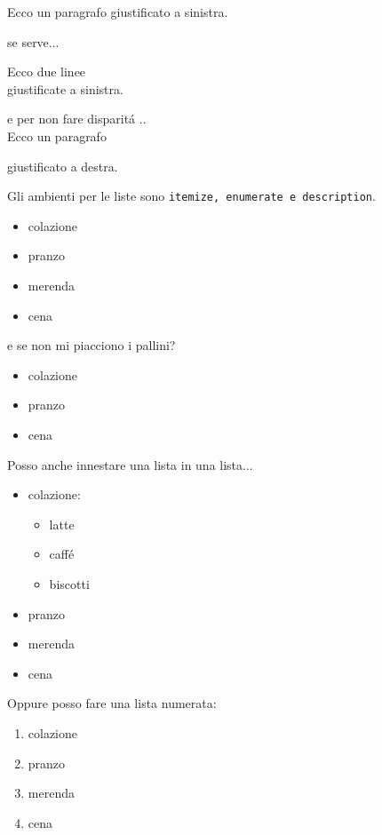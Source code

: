 \documentclass[12pt]{article}
\begin{document}
\bigskip

\begin{flushleft}
Ecco un paragrafo giustificato a sinistra. 

se serve...

Ecco due linee \\
giustificate a sinistra.
\end{flushleft}

\bigskip
\begin{flushright}
e per non fare disparit\'a ..\\
Ecco un paragrafo 

giustificato a destra. 

\end{flushright}
\newpage

Gli ambienti per le {\LARGE liste} sono {\tt itemize, enumerate e description}.

\begin{itemize}
\item colazione
\item pranzo
\item merenda
\item cena
\end{itemize}

e se non mi piacciono i pallini?
\begin{itemize}
\item[!] colazione
\item[?] pranzo
\item[+] cena
\end{itemize}


Posso anche innestare una lista in una lista...
\begin{itemize}
\item colazione:
	\begin{itemize}
		\item latte
		\item caff\'e
		\item biscotti
	\end{itemize}
\item pranzo
\item merenda
\item cena
\end{itemize}
 
Oppure posso fare una lista numerata: 

\begin{enumerate}
\item colazione
\item pranzo
\item merenda
\item cena
\end{enumerate}
 
\end{document}
